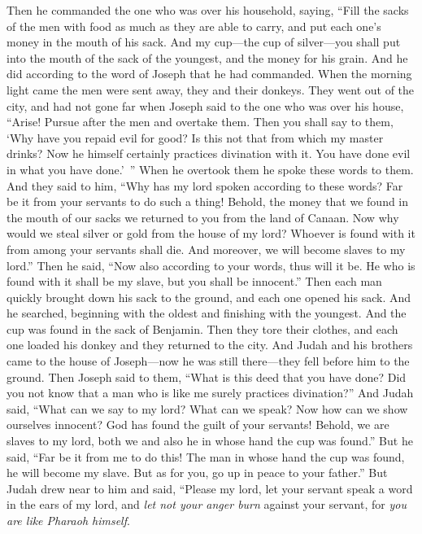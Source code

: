\begin{biblechapter} %
 Then he commanded the one who was over his household, saying, “Fill the sacks of the men with food as much as they are able to carry, and put each one’s money in the mouth of his sack.
\verse And my cup—the cup of silver—you shall put into the mouth of the sack of the youngest, and the money for his grain. And he did according to the word of Joseph that he had commanded.
\verse When the morning light came the men were sent away, they and their donkeys.
\verse They went out of the city, and had not gone far when Joseph said to the one who was over his house, “Arise! Pursue after the men and overtake them. Then you shall say to them, ‘Why have you repaid evil for good?
\verse Is this not that from which my master drinks? Now he himself certainly practices divination with it. You have done evil in what you have done.’ ”
\verse When he overtook them he spoke these words to them.
\verse And they said to him, “Why has my lord spoken according to these words? Far be it from your servants to do such a thing!
\verse Behold, the money that we found in the mouth of our sacks we returned to you from the land of Canaan. Now why would we steal silver or gold from the house of my lord?
\verse Whoever is found with it from among your servants shall die. And moreover, we will become slaves to my lord.”
\verse Then he said, “Now also according to your words, thus will it be. He who is found with it shall be my slave, but you shall be innocent.”
\verse Then each man quickly brought down his sack to the ground, and each one opened his sack.
\verse And he searched, beginning with the oldest and finishing with the youngest. And the cup was found in the sack of Benjamin.
\verse Then they tore their clothes, and each one loaded his donkey and they returned to the city.
\verse And Judah and his brothers came to the house of Joseph—now he was still there—they fell before him to the ground.
\verse Then Joseph said to them, “What is this deed that you have done? Did you not know that a man who is like me surely practices divination?”
\verse And Judah said, “What can we say to my lord? What can we speak? Now how can we show ourselves innocent? God has found the guilt of your servants! Behold, we are slaves to my lord, both we and also he in whose hand the cup was found.”
\verse But he said, “Far be it from me to do this! The man in whose hand the cup was found, he will become my slave. But as for you, go up in peace to your father.”
\verse But Judah drew near to him and said, “Please my lord, let your servant speak a word in the ears of my lord, and \textit{let not your anger burn} against your servant, for \textit{you are like Pharaoh himself}.

\end{biblechapter}
